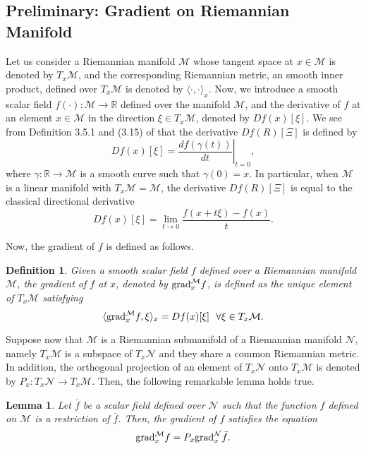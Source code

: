 \documentclass[conference,letterpaper]{ieeeconf}
\newtheorem{lemma}{Lemma}
\newtheorem{definition}{Definition}
\newcommand{\grad}{{\rm grad}}
\newcommand{\N}{\mathcal{N}}
\newcommand{\M}{{\mathcal M}}
\newcommand{\R}{{\mathbb R}}
\begin{document}
\subsection*{Preliminary: Gradient on Riemannian Manifold}








Let us consider a Riemannian manifold $\M$ whose
tangent space at $x \in \M$ is denoted by $T_x\M$,
and the corresponding Riemannian metric, an smooth inner product, 
defined over $T_x\M$ is denoted by $\langle \cdot,\cdot\rangle_x$.
Now, we introduce a smooth scalar field $f(\cdot): \M \to \R$ defined over the manifold $\M$,
and the derivative of $f$ at an element $x \in \M$ in the direction $\xi \in T_x\M$,
denoted by $Df(x)[\xi]$.
We see from Definition 3.5.1 and (3.15) of \cite{AMS_BK}
that the derivative $Df(R)[\Xi]$ is defined by
\[
Df(x)[\xi] = \left.\frac{d f(\gamma(t))}{dt}\right|_{t = 0},
\]
where $\gamma: \R \to \M$ is a smooth curve
such that $\gamma(0) = x$.
In particular, when $\M$ is a linear manifold with $T_x\M = \M$,
 the derivative $Df(R)[\Xi]$ is equal to the classical directional derivative
\begin{equation}
Df(x)[\xi] = \lim_{t\to 0}\frac{f(x + t\xi)-f(x)}{t}.
\label{eqn:derivative_lin_M}
\end{equation}



Now, the gradient of $f$
is defined as follows.
\begin{definition}\cite{AMS_BK}
\label{def:grad_M}
Given a smooth scalar field $f$ defined over a Riemannian manifold $\M$,
the gradient  of $f$ at $x$, denoted by $\grad_x^{\M} f$, is defined as the unique
element of $T_x\M$ satisfying
\[
\langle \grad_x^{\M} f, \xi\rangle_x = Df(x)[\xi]\ \ {\forall \xi}\in T_x\M.
\]
\end{definition}
Suppose now that $\M$ is a Riemannian 
submanifold of a Riemannian manifold $\N$,
namely $T_x\M$ is a subspace of $T_x \N$ and
they share a common Riemannian metric.
In addition, the orthogonal projection of an element of $T_x \N$
onto $T_x\M$ is denoted by $P_x: T_x \N \to T_x \M$.
Then, the following remarkable lemma holds true.
\begin{lemma}\cite{AMS_BK}
\label{lem:grad_proj}
Let $\bar f$ be a scalar field defined over $\N$
such that the function $f$ defined on $\M$ 
is a restriction of $\bar f$.
Then, the gradient of $f$ satisfies the equation
\begin{equation}
\grad_x^{\M}f = P_x \grad_x^{\N} \bar f.
\label{eqn:grad_proj}
\end{equation}
\end{lemma}
\end{document}
